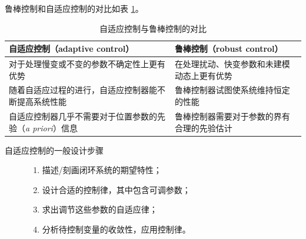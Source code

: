鲁棒控制和自适应控制的对比如表 \ref{adaptive_robust_table}。
\newpage
  \begin{table}[htbp]
    \vspace{5pt}
    \caption{自适应控制与鲁棒控制的对比}
    \label{adaptive_robust_table}
    \setcellgapes{4pt}
    \makegapedcells
    \small
    \centering
    \begin{tabular}{p{}|p{}}
      \hline
      {\bf 自适应控制（adaptive control）} & {\bf 鲁棒控制（robust control）} \\
      \hline
      对于处理慢变或不变的参数不确定性上更有优势 & 在处理扰动、快变参数和未建模动态上更有优势\\
      \hline
      随着自适应过程的进行，自适应控制器能不断提高系统性能 & 鲁棒控制器试图使系统维持恒定的性能 \\
      \hline
      自适应控制器几乎不需要对于位置参数的先验（{\it a priori}）信息 & 鲁棒控制器需要对于参数的界有合理的先验估计\\
      \hline
    \end{tabular}
  \end{table}

\begin{description}
  \item[自适应控制的一般设计步骤] 
  \begin{enumerate}
    \item 描述/刻画闭环系统的期望特性；
    \item 设计合适的控制律，其中包含可调参数；
    \item 求出调节这些参数的自适应律；
    \item 分析待控制变量的收敛性，应用控制律。
  \end{enumerate}
\end{description}
